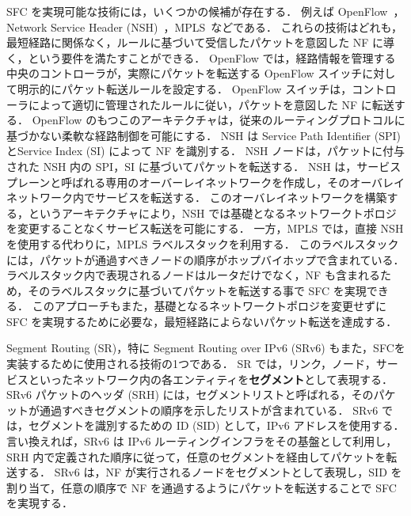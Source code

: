 SFC を実現可能な技術には，いくつかの候補が存在する．
例えば OpenFlow~\cite{openflow}，Network Service Header (NSH)~\cite{rfc8300}，\fussy MPLS~\cite{rfc8595}などである．
これらの技術はどれも，最短経路に関係なく，ルールに基づいて受信したパケットを意図した NF に導く，という要件を満たすことができる．
OpenFlow では，経路情報を管理する中央のコントローラが，実際にパケットを転送する OpenFlow スイッチに対して明示的にパケット転送ルールを設定する．
OpenFlow スイッチは，コントローラによって適切に管理されたルールに従い，パケットを意図した NF に転送する．
OpenFlow のもつこのアーキテクチャは，従来のルーティングプロトコルに基づかない柔軟な経路制御を可能にする．
NSH は Service Path Identifier (SPI) とService Index (SI) によって NF を識別する．
NSH ノードは，パケットに付与された NSH 内の SPI，SI に基づいてパケットを転送する．
NSH は，サービスプレーンと呼ばれる専用のオーバーレイネットワークを作成し，そのオーバレイネットワーク内でサービスを転送する．
このオーバレイネットワークを構築する，というアーキテクチャにより，NSH では基礎となるネットワークトポロジを変更することなくサービス転送を可能にする．
一方，MPLS では，直接 NSH を使用する代わりに，MPLS ラベルスタックを利用する．
このラベルスタックには，パケットが通過すべきノードの順序がホップバイホップで含まれている．
ラベルスタック内で表現されるノードはルータだけでなく，NF も含まれるため，そのラベルスタックに基づいてパケットを転送する事で SFC を実現できる．
このアプローチもまた，基礎となるネットワークトポロジを変更せずに SFC を実現するために必要な，最短経路によらないパケット転送を達成する．

Segment Routing (SR)，特に Segment Routing over IPv6 (SRv6) もまた，SFCを実装するために使用される技術の1つである．
SR では，リンク，ノード，サービスといったネットワーク内の各エンティティを\textbf{セグメント}として表現する．
SRv6 パケットのヘッダ (SRH) には，セグメントリストと呼ばれる，そのパケットが通過すべきセグメントの順序を示したリストが含まれている．
SRv6 では，セグメントを識別するための ID (SID) として，IPv6 アドレスを使用する．
言い換えれば，SRv6 は IPv6 ルーティングインフラをその基盤として利用し，SRH 内で定義された順序に従って，任意のセグメントを経由してパケットを転送する．
SRv6 は，NF が実行されるノードをセグメントとして表現し，SID を割り当て，任意の順序で NF を通過するようにパケットを転送することで SFC を実現する．

